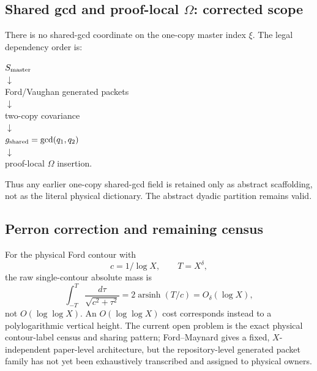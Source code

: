 \subsection{Shared gcd and proof-local $\Omega$: corrected scope}
There is no shared-gcd coordinate on the one-copy master index $\xi$.  The legal dependency
order is:
\begin{center}
\small
$S_{\rm master}$\\
$\downarrow$\\
Ford/Vaughan generated packets\\
$\downarrow$\\
two-copy covariance\\
$\downarrow$\\
$g_{\rm shared}=\gcd(q_1,q_2)$\\
$\downarrow$\\
proof-local $\Omega$ insertion.
\end{center}
Thus any earlier one-copy shared-gcd field is retained only as abstract scaffolding, not as
the literal physical dictionary.  The abstract dyadic partition remains valid.

\subsection{Perron correction and remaining census}
For the physical Ford contour with
\[
c=1/\log X,\qquad T=X^\delta,
\]
the raw single-contour absolute mass is
\[
\int_{-T}^{T}\frac{d\tau}{\sqrt{c^2+\tau^2}}
 =2\operatorname{arsinh}(T/c)
 =O_\delta(\log X),
\]
not $O(\log\log X)$.  An $O(\log\log X)$ cost corresponds instead to a polylogarithmic
vertical height.  The current open problem is the exact physical contour-label census and
sharing pattern; Ford--Maynard gives a fixed, $X$-independent paper-level architecture, but
the repository-level generated packet family has not yet been exhaustively transcribed and
assigned to physical owners.

